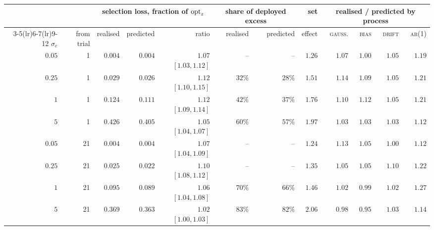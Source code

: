 \begin{tabular}{rr rrr rr r rrrr}
\toprule
 & & \multicolumn{3}{c}{selection loss, fraction of $\mathrm{opt}_z$} & \multicolumn{2}{c}{share of deployed excess} & set & \multicolumn{4}{c}{realised / predicted by process} \\
\cmidrule(lr){3-5}\cmidrule(lr){6-7}\cmidrule(lr){9-12}
$\sigma_e$ & from trial & realised & predicted & ratio & realised & predicted & effect & \textsc{gauss.} & \textsc{bias} & \textsc{drift} & \textsc{ar}(1) \\
\midrule
$0.05$ & 1 & $0.004$ & $0.004$ & $1.07$ $[1.03, 1.12]$ & -- & -- & $1.26$ & $1.07$ & $1.00$ & $1.05$ & $1.19$ \\
$0.25$ & 1 & $0.029$ & $0.026$ & $1.12$ $[1.10, 1.15]$ & $32\%$ & $28\%$ & $1.51$ & $1.14$ & $1.09$ & $1.05$ & $1.21$ \\
$1$ & 1 & $0.124$ & $0.111$ & $1.12$ $[1.09, 1.14]$ & $42\%$ & $37\%$ & $1.76$ & $1.10$ & $1.12$ & $1.05$ & $1.21$ \\
$5$ & 1 & $0.426$ & $0.405$ & $1.05$ $[1.04, 1.07]$ & $60\%$ & $57\%$ & $1.97$ & $1.03$ & $1.03$ & $1.03$ & $1.12$ \\
$0.05$ & 21 & $0.004$ & $0.004$ & $1.07$ $[1.04, 1.09]$ & -- & -- & $1.24$ & $1.13$ & $1.05$ & $1.00$ & $1.12$ \\
$0.25$ & 21 & $0.025$ & $0.022$ & $1.10$ $[1.08, 1.12]$ & -- & -- & $1.35$ & $1.05$ & $1.05$ & $1.10$ & $1.22$ \\
$1$ & 21 & $0.095$ & $0.089$ & $1.06$ $[1.04, 1.08]$ & $70\%$ & $66\%$ & $1.46$ & $1.02$ & $0.99$ & $1.02$ & $1.27$ \\
$5$ & 21 & $0.369$ & $0.363$ & $1.02$ $[1.00, 1.03]$ & $83\%$ & $82\%$ & $2.06$ & $0.98$ & $0.95$ & $1.03$ & $1.14$ \\
\bottomrule
\end{tabular}
